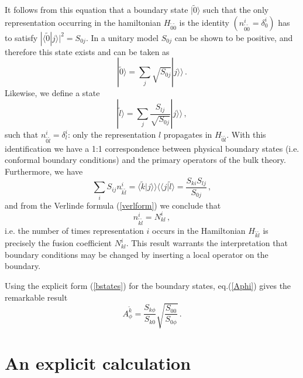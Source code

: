\documentclass[a4paper,12pt]{report}
\begin{document}
It follows from this equation that a boundary state $|\tilde{0}\rangle$ such that the only representation
occurring in the hamiltonian $H_{\tilde{0}\tilde{0}}$ is the identity
$\left(n_{\tilde{0}\tilde{0}}^{i}=\delta_{0}^{i}\right)$ has to satisfy $|\langle\tilde{0}|j\rangle|^{2}=S_{0j}$.
In a unitary model $S_{0j}$ can be shown to be positive, and therefore this state exists and can be taken as
\begin{equation}
|\tilde{0}\rangle=\sum_{j}\sqrt{S_{0j}}|j\rangle\rangle\,.
\end{equation}
Likewise, we define a state
\begin{equation}\label{bstates}
|\tilde{l}\rangle=\sum_{j}\frac{S_{lj}}{\sqrt{S_{0j}}}|j\rangle\rangle\,,
\end{equation}
such that $n_{\tilde{0}\tilde{l}}^{i}=\delta_{l}^{i}$: only the representation $l$ propagates in
$H_{\tilde{0}\tilde{l}}$. With this identification we have a 1:1 correspondence between physical boundary states
(i.e. conformal boundary conditions) and the primary operators of the bulk theory. Furthermore, we have
\begin{equation}
\sum_{i}S_{ij}n_{\tilde{k}\tilde{l}}^{i}=\langle\tilde{k}|j\rangle\rangle\langle\langle
j|\tilde{l}\rangle=\frac{S_{ki}S_{lj}}{S_{0j}}\,,
\end{equation}
and from the Verlinde formula (\ref{verlform}) we conclude that
\begin{equation}
n_{\tilde{k}\tilde{l}}^{i}=N_{kl}^{i}\,,
\end{equation}
i.e. the number of times representation $i$ occurs in the Hamiltonian $H_{\tilde{k}\tilde{l}}$ is precisely the
fusion coefficient $N_{kl}^{i}$. This result warrants the interpretation that boundary conditions may be changed
by inserting a local operator on the boundary.

Using the explicit form (\ref{bstates}) for the boundary states, eq.(\ref{Aphi}) gives the remarkable result
\begin{equation}\label{Aexpl}
A_{\phi}^{\tilde{k}}=\frac{S_{k\phi}}{S_{k0}}\sqrt{\frac{S_{00}}{S_{0\phi}}}\,.
\end{equation}

\newpage

\section{An explicit calculation}
\end{document}
